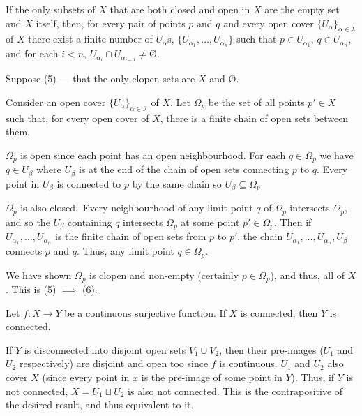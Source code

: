 \documentclass[12 pt, letterpaper]{hmcpset}
\begin{document}
\begin{problem}[8.1, (5) $\implies$ (6)]
	If the only subsets of $X$ that are both closed and open in $X$ are the empty set and $X$ itself, then, for every pair of points $p$ and $q$ and every open cover $\{ U_{\alpha} \}_{\alpha \in \lambda}$ of $X$ there exist a finite number of $U_{\alpha}$s, $\{ U_{\alpha_{1}}, \dots, U_{\alpha_{n}} \}$ such that $p \in U_{\alpha_{1}}$, $q \in U_{\alpha_{n}}$, and for each $i < n$, $U_{\alpha_{i}} \cap U_{\alpha_{i + 1}} \neq \text{\O}$.
\end{problem}

\begin{solution}
	Suppose (5) --- that the only clopen sets are $X$ and $\text{\O}$.

	Consider an open cover $\{ U_{\alpha} \}_{\alpha \in \mathcal{I}}$ of $X$. Let $\Omega_{p}$ be the set of all points $p' \in X$ such that, for every open cover of $X$, there is a finite chain of open sets between them. 

	$\Omega_{p}$ is open since each point has an open neighbourhood. For each $q \in \Omega_{p}$ we have $q \in U_{\beta}$ where $U_{\beta}$ is at the end of the chain of open sets connecting $p$ to $q$. Every point in $U_{\beta}$ is connected to $p$ by the same chain so $U_{\beta} \subseteq \Omega_{p}$

	$\Omega_{p}$ is also closed. Every neighbourhood of any limit point $q$ of $\Omega_{p}$ intersects $\Omega_{p}$, and so the $U_{\beta}$ containing $q$ intersects $\Omega_{p}$ at some point $p' \in \Omega_{p}$. Then if $U_{\alpha_{1}}, \dots, U_{\alpha_{n}}$ is the finite chain of open sets from $p$ to $p'$, the chain $U_{\alpha_{1}}, \dots, U_{\alpha_{n}}, U_{\beta}$ connects $p$ and $q$. Thus, any limit point $q \in \Omega_{p}$. 

	We have shown $\Omega_{p}$ is clopen and non-empty (certainly $p \in \Omega_{p}$), and thus, all of $X$. This is (5) $\implies$ (6).
\end{solution}

\pagebreak

\begin{problem}[8.9]
	Let $f : X \to Y$ be a continuous surjective function. If $X$ is connected, then $Y$ is connected.
\end{problem}

\begin{solution}
	If $Y$ is disconnected into disjoint open sets $V_{1} \cup V_{2}$, then their pre-images ($U_{1}$ and $U_{2}$ respectively) are disjoint and open too since $f$ is continuous. $U_{1}$ and $U_{2}$ also cover $X$ (since every point in $x$ is the pre-image of some point in $Y$). Thus, if $Y$ is not connected, $X = U_{1} \sqcup U_{2}$ is also not connected. This is the contrapositive of the desired result, and thus equivalent to it.
\end{solution}
\end{document}

